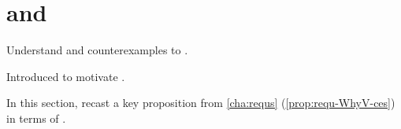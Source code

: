 \section{ and \issueConstraint{}}
\label{sec:tpyically-concluding}

\begin{note}
  Understand \requ{} and counterexamples to \issueConstraint{}.

  Introduced \tCV{} to motivate \requ{}.

  In this section, recast a key proposition from \autoref{cha:requs} (\autoref{prop:requ-WhyV-ces}) in terms of \tCV{}.
\end{note}







